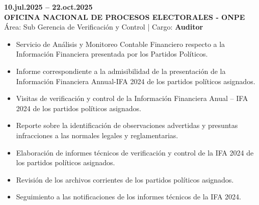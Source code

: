 \documentclass[11pt,a4paper]{article}
\begin{document}
\noindent
\textbf{10.jul.2025 -- 22.oct.2025}\\
\textbf{OFICINA NACIONAL DE PROCESOS ELECTORALES - ONPE}\\
\'Area: Sub Gerencia de Verificaci\'on y Control \quad | \quad Cargo: \textbf{Auditor}
\begin{itemize}
\item Servicio de An\'alisis y Monitoreo Contable Financiero respecto a la Informaci\'on Financiera presentada por los Partidos Pol\'iticos.
\item Informe correspondiente a la admisibilidad de la presentaci\'on de la Informaci\'on Financiera Annual-IFA 2024 de los partidos pol\'iticos asignados.
\item Visitas de verificaci\'on y control de la Informaci\'on Financiera Anual -- IFA 2024 de los partidos pol\'iticos asignados.
\item Reporte sobre la identificaci\'on de observaciones advertidas y presuntas infracciones a las normales legales y reglamentarias.
\item Elaboraci\'on de informes t\'ecnicos de verificaci\'on y control de la IFA 2024 de los partidos pol\'iticos asignados.
\item Revisi\'on de los archivos corrientes de los partidos pol\'iticos asignados.
\item Seguimiento a las notificaciones de los informes t\'ecnicos de la IFA 2024.
\end{itemize}
\end{document}
